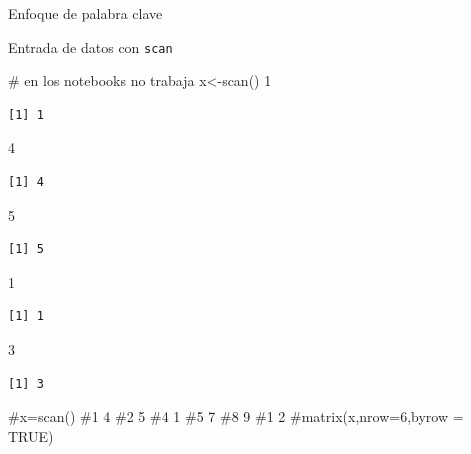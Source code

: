 \documentclass[
  ignorenonframetext,
  aspectratio=169,
  spanish,
]{beamer}
\newenvironment{Shaded}{\begin{snugshade}}{\end{snugshade}}
\newcommand{\CommentTok}[1]{\textcolor[rgb]{0.37,0.37,0.37}{#1}}
\newcommand{\DecValTok}[1]{\textcolor[rgb]{0.68,0.00,0.00}{#1}}
\newcommand{\FunctionTok}[1]{\textcolor[rgb]{0.28,0.35,0.67}{#1}}
\newcommand{\NormalTok}[1]{\textcolor[rgb]{0.00,0.23,0.31}{#1}}
\newcommand{\OtherTok}[1]{\textcolor[rgb]{0.00,0.23,0.31}{#1}}
\begin{document}
\begin{frame}[fragile]{Enfoque de palabra clave}
\begin{block}{Entrada de datos con \texttt{scan}}
\begin{Shaded}
\begin{Highlighting}[]
\CommentTok{\# en los notebooks no trabaja }
\NormalTok{x}\OtherTok{\textless{}{-}}\FunctionTok{scan}\NormalTok{()}
\DecValTok{1}
\end{Highlighting}
\end{Shaded}

\begin{verbatim}
[1] 1
\end{verbatim}

\begin{Shaded}
\begin{Highlighting}[]
\DecValTok{4}
\end{Highlighting}
\end{Shaded}

\begin{verbatim}
[1] 4
\end{verbatim}

\begin{Shaded}
\begin{Highlighting}[]
\DecValTok{5}
\end{Highlighting}
\end{Shaded}

\begin{verbatim}
[1] 5
\end{verbatim}

\begin{Shaded}
\begin{Highlighting}[]
\DecValTok{1}
\end{Highlighting}
\end{Shaded}

\begin{verbatim}
[1] 1
\end{verbatim}

\begin{Shaded}
\begin{Highlighting}[]
\DecValTok{3}
\end{Highlighting}
\end{Shaded}

\begin{verbatim}
[1] 3
\end{verbatim}

\begin{Shaded}
\begin{Highlighting}[]
\CommentTok{\#x=scan()}
\CommentTok{\#1 4 }
\CommentTok{\#2 5 }
\CommentTok{\#4 1 }
\CommentTok{\#5 7 }
\CommentTok{\#8 9 }
\CommentTok{\#1 2 }
\CommentTok{\#matrix(x,nrow=6,byrow = TRUE)}
\end{Highlighting}
\end{Shaded}


\end{block}
\end{frame}
\end{document}

